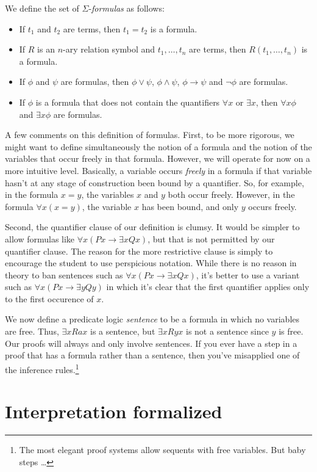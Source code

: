 We define the set of $\Sigma$-\emph{formulas} as follows:
\begin{itemize}
\item If $t_1$ and $t_2$ are terms, then $t_1=t_2$ is a formula.
\item If $R$ is an $n$-ary relation symbol and $t_1,\dots ,t_n$ are
  terms, then $R(t_1,\dots ,t_n)$ is a formula.
\item If $\phi$ and $\psi$ are formulas, then $\phi\vee\psi$,
  $\phi\wedge\psi$, $\phi\to\psi$ and $\neg\phi$ are formulas.
\item If $\phi$ is a formula that does not contain the quantifiers
  $\forall x$ or $\exists x$, then $\forall x\phi$ and $\exists x\phi$
  are formulas.
\end{itemize}
A few comments on this definition of formulas.  First, to be more
rigorous, we might want to define simultaneously the notion of a
formula and the notion of the variables that occur freely in that
formula.  However, we will operate for now on a more intuitive level.
Basically, a variable occurs \emph{freely} in a formula if that
variable hasn't at any stage of construction been bound by a
quantifier.  So, for example, in the formula $x=y$, the variables $x$
and $y$ both occur freely.  However, in the formula $\forall x(x=y)$,
the variable $x$ has been bound, and only $y$ occurs freely.

Second, the quantifier clause of our definition is clumsy.  It would
be simpler to allow formulas like $\forall x(Px\to \exists xQx)$, but
that is not permitted by our quantifier clause.  The reason for the
more restrictive clause is simply to encourage the student to use
perspicious notation.  While there is no reason in theory to ban
sentences such as $\forall x(Px\to \exists xQx)$, it's better to use a
variant such as $\forall x(Px\to \exists yQy)$ in which it's clear
that the first quantifier applies only to the first occurence of $x$.

We now define a predicate logic \emph{sentence} to be a formula in
which no variables are free.  Thus, $\exists xRax$ is a sentence, but
$\exists xRyx$ is not a sentence since $y$ is free.  Our proofs will
always and only involve sentences.  If you ever have a step in a proof
that has a formula rather than a sentence, then you've misapplied one
of the inference rules.\footnote{The most elegant proof systems allow
  sequents with free variables.  But baby steps
  \dots }


\section{Interpretation formalized}

